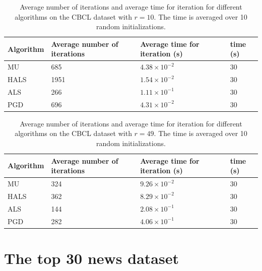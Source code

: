 \begin{table}[htbp]
\begin{tabular}{|l|l|l|l|}
\hline
Algorithm & Average number of iterations & Average time for iteration (s) & time (s) \\ \hline
MU        & 685                          & $4.38 \times 10^{-2}     $                & 30       \\ \hline
HALS      & 1951                        & $1.54 \times 10^{-2}     $                & 30        \\ \hline
ALS       & 266                        & $1.11 \times 10^{-1}     $                & 30       \\ \hline
PGD       & 696                       & $4.31 \times 10^{-2}     $                & 30       \\ \hline
\end{tabular}
\caption{Average number of iterations and average time for iteration for different algorithms on the CBCL dataset with $r = 10$. The time is averaged over 10 random initializations.}
\label{tab:CBCL results 10}
\end{table}

\begin{table}[htbp]
\begin{tabular}{|l|l|l|l|}
\hline
Algorithm & Average number of iterations & Average time for iteration (s) & time (s) \\ \hline
MU        & 324                          & $9.26 \times 10^{-2}     $                & 30       \\ \hline
HALS      & 362                          & $8.29 \times 10^{-2}     $                & 30        \\ \hline
ALS       & 144                          & $2.08 \times 10^{-1}     $                & 30       \\ \hline
PGD       & 282                          & $4.06 \times 10^{-1}     $                & 30       \\ \hline
\end{tabular}
\caption{Average number of iterations and average time for iteration for different algorithms on the CBCL dataset with $r = 49$. The time is averaged over 10 random initializations.}
\label{tab:CBCL results 49}
\end{table}


\section{The top 30 news dataset}

